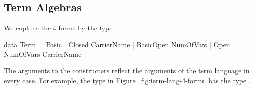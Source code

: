 \subsection{Term Algebras}
\begin{comment}
We differentiate between $4$ different forms of term languages that differ in their expressive power, as shown in Figure~\ref{fig:term-lang-4-forms}. 
\begin{figure}
    
    \caption{The term language of \lstmath{Monoid} expressed in $4$ different ways.}
    \label{fig:term-lang-4-forms}
\end{figure}

The \lstmath{Basic} term language defines expressions created using the function symbols of the theory. At this level of abstraction, referring to elements of the carrier is not possible.
Considering, for example, the binary operation of the basic \lstmath{Monoid} term language in Figure~\ref{fig:term-lang-4-forms}, \lstmath{opL}. Its arguments are either the constant \lstmath{eL} or another call for \lstmath{opL}. 
\lstmath{Closed} term languages solve this problem by providing the \lstmath{sing} constructor, abbreviation for \emph{singleton}, that lifts element of type \lstmath{A} into instances of the closed term language. Assuming that the carrier is the type of natural numbers \lstmath{Nat}, a possible term in the language would be \lstmath{opCl (sing (suc zero)) eCl}. 

\lstmath{Open} term languages provides extra constructor to represent variables. A convenient representation of variables is using the \lstmath{Fin} type. 
The two open term languages are shown on the right hand side of Figure~\ref{fig:term-lang-4-forms}.  
\end{comment} 
We capture the $4$ forms by the type . 
\begin{hscode}
data Term = Basic
          | Closed CarrierName
          | BasicOpen NumOfVars
          | Open NumOfVars CarrierName
\end{hscode}
\noindent The arguments to the constructors reflect the arguments of the term language in every case. For example, the type  in Figure~\ref{fig:term-lang-4-forms} has the type . 

